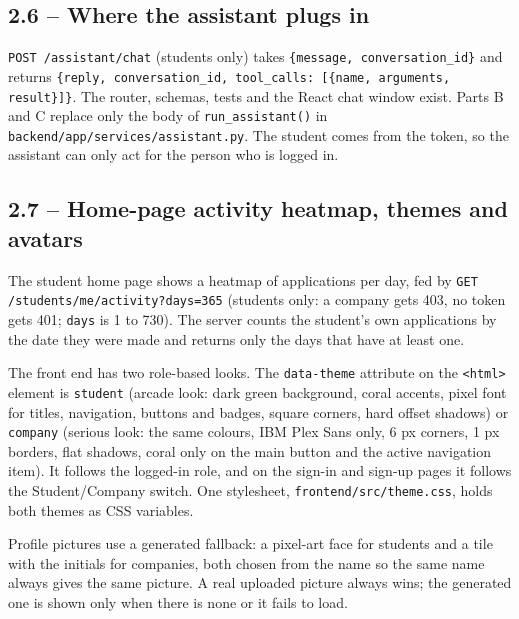 \documentclass[11pt,letterpaper]{article}
\newcommand{\code}[1]{\texttt{#1}}
\begin{document}
\subsection*{2.6 -- Where the assistant plugs in}

\code{POST /\allowbreak{}assistant/\allowbreak{}chat} (students only) takes \code{\{message,\allowbreak{} conversation\_\allowbreak{}id\}} and returns \code{\{reply,\allowbreak{} conversation\_\allowbreak{}id,\allowbreak{} tool\_\allowbreak{}calls:\allowbreak{} [\allowbreak{}\{name,\allowbreak{} arguments,\allowbreak{} result\}]\allowbreak{}\}}. The router, schemas, tests and the React chat window exist. Parts B and C replace only the body of \code{run\_\allowbreak{}assistant()} in \code{backend/\allowbreak{}app/\allowbreak{}services/\allowbreak{}assistant.\allowbreak{}py}. The student comes from the token, so the assistant can only act for the person who is logged in.

\subsection*{2.7 -- Home-page activity heatmap, themes and avatars}

The student home page shows a heatmap of applications per day, fed by \code{GET /\allowbreak{}students/\allowbreak{}me/\allowbreak{}activity?days=\allowbreak{}365} (students only: a company gets 403, no token gets 401; \code{days} is 1 to 730). The server counts the student's own applications by the date they were made and returns only the days that have at least one.

The front end has two role-based looks. The \code{data-\allowbreak{}theme} attribute on the \code{<html>} element is \code{student} (arcade look: dark green background, coral accents, pixel font for titles, navigation, buttons and badges, square corners, hard offset shadows) or \code{company} (serious look: the same colours, IBM Plex Sans only, 6 px corners, 1 px borders, flat shadows, coral only on the main button and the active navigation item). It follows the logged-in role, and on the sign-in and sign-up pages it follows the Student/Company switch. One stylesheet, \code{frontend/\allowbreak{}src/\allowbreak{}theme.\allowbreak{}css}, holds both themes as CSS variables.

Profile pictures use a generated fallback: a pixel-art face for students and a tile with the initials for companies, both chosen from the name so the same name always gives the same picture. A real uploaded picture always wins; the generated one is shown only when there is none or it fails to load.
\end{document}
